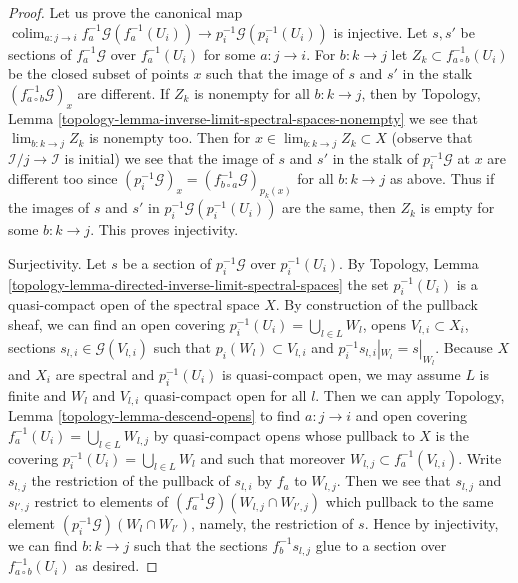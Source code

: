 \documentclass{stacks-project}
\theoremstyle{plain}
\theoremstyle{definition}
\theoremstyle{remark}
\numberwithin{equation}{subsection}
\def\lim{\mathop{\mathrm{lim}}\nolimits}
\def\colim{\mathop{\mathrm{colim}}\nolimits}
\begin{document}
\begin{proof}
Let us prove the canonical map
$\colim_{a : j \to i} f_a^{-1}\mathcal{G}(f_a^{-1}(U_i)) \to
p_i^{-1}\mathcal{G}(p_i^{-1}(U_i))$ is injective.
Let $s, s'$ be sections of $f_a^{-1}\mathcal{G}$
over $f_a^{-1}(U_i)$ for some $a : j \to i$. For
$b : k \to j$ let $Z_k \subset f_{a \circ b}^{-1}(U_i)$
be the closed subset of points $x$ such that the image of
$s$ and $s'$ in the stalk $(f_{a \circ b}^{-1}\mathcal{G})_x$
are different. If $Z_k$ is nonempty for all $b : k \to j$, then by
Topology, Lemma \ref{topology-lemma-inverse-limit-spectral-spaces-nonempty}
we see that $\lim_{b : k \to j} Z_k$ is nonempty too.
Then for $x \in \lim_{b : k \to j} Z_k \subset X$
(observe that $\mathcal{I}/j \to \mathcal{I}$ is initial)
we see that the image of $s$ and $s'$ in the stalk of
$p_i^{-1}\mathcal{G}$ at $x$ are different too since
$(p_i^{-1}\mathcal{G})_x = (f_{b \circ a}^{-1}\mathcal{G})_{p_k(x)}$
for all $b : k \to j$ as above. Thus if the images of $s$ and $s'$
in $p_i^{-1}\mathcal{G}(p_i^{-1}(U_i))$ are the same, then $Z_k$
is empty for some $b : k \to j$. This proves injectivity.

\medskip\noindent
Surjectivity. Let $s$ be a section of $p_i^{-1}\mathcal{G}$ over
$p_i^{-1}(U_i)$. By
Topology, Lemma \ref{topology-lemma-directed-inverse-limit-spectral-spaces}
the set $p_i^{-1}(U_i)$ is a quasi-compact open of the spectral space $X$.
By construction of the pullback sheaf, we can find an open covering
$p_i^{-1}(U_i) = \bigcup_{l \in L} W_l$,
opens $V_{l, i} \subset X_i$,
sections $s_{l, i} \in \mathcal{G}(V_{l, i})$
such that $p_i(W_l) \subset V_{l, i}$ and $p_i^{-1}s_{l, i}|_{W_l} = s|_{W_l}$.
Because $X$ and $X_i$ are spectral and $p_i^{-1}(U_i)$ is quasi-compact open,
we may assume $L$ is finite and $W_l$ and $V_{l, i}$ quasi-compact open
for all $l$. Then we can apply
Topology, Lemma \ref{topology-lemma-descend-opens}
to find $a : j \to i$ and open covering
$f_a^{-1}(U_i) = \bigcup_{l \in L} W_{l, j}$ by quasi-compact
opens whose pullback to $X$ is the covering
$p_i^{-1}(U_i) = \bigcup_{l \in L} W_l$
and such that moreover $W_{l, j} \subset f_a^{-1}(V_{l, i})$.
Write $s_{l, j}$ the restriction of the pullback of $s_{l, i}$
by $f_a$ to $W_{l, j}$. Then we see that $s_{l, j}$ and $s_{l', j}$
restrict to elements of $(f_a^{-1}\mathcal{G})(W_{l, j} \cap W_{l', j})$
which pullback to the same element $(p_i^{-1}\mathcal{G})(W_l \cap W_{l'})$,
namely, the restriction of $s$. Hence by injectivity, we can find
$b : k \to j$ such that the sections $f_b^{-1}s_{l, j}$
glue to a section over $f_{a \circ b}^{-1}(U_i)$ as desired.
\end{proof}
\end{document}
